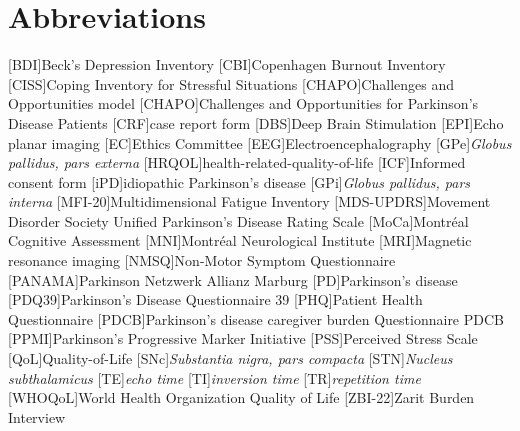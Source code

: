 \chapter*{Abbreviations}
\let\oldbaselinestretch=\baselinestretch%
\renewcommand{\baselinestretch}{1}%
\large\normalsize%
\thispagestyle{plain}
\begin{multicols}{2}
\begin{acronym}
\setlength{\parskip}{0ex}
[BDI]{Beck's Depression Inventory}
[CBI]{Copenhagen Burnout Inventory}
[CISS]{Coping Inventory for Stressful Situations}
[CHAPO]{Challenges and Opportunities model}
[CHAPO]{Challenges and Opportunities for Parkinson's Disease Patients}
[CRF]{case report form}
[DBS]{Deep Brain Stimulation}
[EPI]{Echo planar imaging}
[EC]{Ethics Committee}
[EEG]{Electroencephalography}
[GPe]{\textit{Globus pallidus, pars externa}}
[HRQOL]{health-related-quality-of-life}
[ICF]{Informed consent form}
[iPD]{idiopathic Parkinson's disease}
[GPi]{\textit{Globus pallidus, pars interna}}
[MFI-20]{Multidimensional Fatigue Inventory}
[MDS-UPDRS]{Movement Disorder Society Unified Parkinson's Disease Rating Scale}
[MoCa]{Montréal Cognitive Assessment}
[MNI]{Montréal Neurological Institute}
[MRI]{Magnetic resonance imaging}
[NMSQ]{Non-Motor Symptom Questionnaire}
[PANAMA]{Parkinson Netzwerk Allianz Marburg}
[PD]{Parkinson's disease}
[PDQ39]{Parkinson's Disease Questionnaire 39}
[PHQ]{Patient Health Questionnaire}
[PDCB]{Parkinson’s disease caregiver burden Questionnaire PDCB}
[PPMI]{Parkinson's Progressive Marker Initiative}
[PSS]{Perceived Stress Scale}
[QoL]{Quality-of-Life}
[SNc]{\textit{Substantia nigra, pars compacta}}
[STN]{\textit{Nucleus subthalamicus}}
[TE]{\textit{echo time}}
[TI]{\textit{inversion time}}
[TR]{\textit{repetition time}}
[WHOQoL]{World Health Organization Quality of Life}
[ZBI-22]{Zarit Burden Interview}
\end{acronym}
\renewcommand{\baselinestretch}{\oldbaselinestretch}%
\large\normalsize%
\end{multicols}
